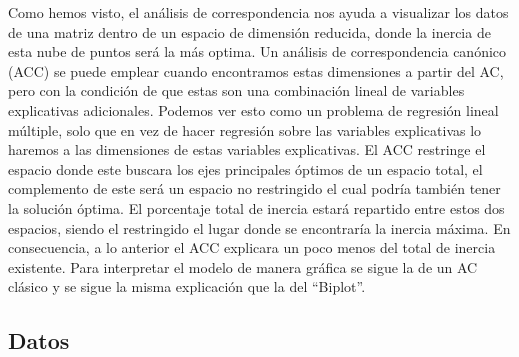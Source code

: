 Como hemos visto, el análisis de correspondencia nos ayuda a visualizar
los datos de una matriz dentro de un espacio de dimensión reducida,
donde la inercia de esta nube de puntos será la más optima. Un análisis
de correspondencia canónico (ACC) se puede emplear cuando encontramos
estas dimensiones a partir del AC, pero con la condición de que estas
son una combinación lineal de variables explicativas adicionales.
Podemos ver esto como un problema de regresión lineal múltiple, solo que
en vez de hacer regresión sobre las variables explicativas lo haremos a
las dimensiones de estas variables explicativas. El ACC restringe el
espacio donde este buscara los ejes principales óptimos de un espacio
total, el complemento de este será un espacio no restringido el cual
podría también tener la solución óptima. El porcentaje total de inercia
estará repartido entre estos dos espacios, siendo el restringido el
lugar donde se encontraría la inercia máxima. En consecuencia, a lo
anterior el ACC explicara un poco menos del total de inercia existente.
Para interpretar el modelo de manera gráfica se sigue la de un AC
clásico y se sigue la misma explicación que la del ``Biplot''.

\hypertarget{datos}{%
\subsection{Datos}\label{datos}}



\address{%
William F. Tandazo-Vargas\\
ESPOL\\%
line 1\\ line 2\\
%
%
%
\\\href{mailto:wtandazo@espol.edu.ec}{\nolinkurl{wtandazo@espol.edu.ec}}
}
